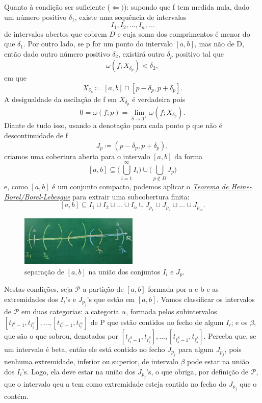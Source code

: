 \documentclass[../analysisII_notes.tex]{subfiles}
\begin{document}
\begin{proof*}
	Quanto à condição ser suficiente (\(\Leftarrow )\)): supondo que f tem medida nula, dado um número positivo \(\delta_{1}\), existe uma sequência de intervalos
	\[
		I_1, I_2, \dotsc , I_n, \dotsc
	\]
	de intervalos abertos que cobrem \(D\) e cuja soma dos comprimentos é menor do que \(\delta_1\). Por outro lado, se p for um ponto do intervalo \([a, b]\), mas não de D, então dado outro número positivo \(\delta_2\), existirá outro \(\delta_p\) positivo tal que
	\[
		\omega (f; X_{\delta_{p}}) < \delta_{2},
	\]
	em que
	\[
		X_{\delta_{p}} \coloneqq [a, b]\cap [p-\delta_p, p+\delta_p].
	\]
	A desigualdade da oscilação de f em \(X_{\delta_p}\) é verdadeira pois
	\[
		0 = \omega (f; p) = \lim_{\delta \to 0^{+}}\omega (f; X_{\delta_{p}}).
	\]
	Diante de tudo isso, usando a denotação para cada ponto p que não é descontinuidade de f
	\[
		J_{p}\coloneqq (p-\delta_p, p+\delta_p),
	\]
	criamos uma cobertura aberta para o intervalo \([a, b]\) da forma
	\[
		[a, b]\subseteq \biggl(\bigcup_{i=1}^{\infty}I_{i}\biggr)\cup \biggl(\bigcup_{p\not\in D}^{}J_{p}\biggr)
	\]
	e, como \([a, b]\) é um conjunto compacto, podemos aplicar o \hyperlink{heine_borel}{\textit{Teorema de Heine-Borel/Borel-Lebesgue}} para extrair uma subcobertura finita:
	\[
		[a, b] \subseteq I_1\cup I_2\cup \dotsc \cup I_{n}\cup J_{p_1}\cup J_{p_2}\cup \dotsc \cup J_{p_{m}}.
	\]
	\begin{figure}[H]
		\begin{center}
			\includegraphics[height=0.5\textheight, width=0.5\textwidth, keepaspectratio]{./Images/covering_intervals_13.png}
		\end{center}
		\caption{separação de \([a, b]\) na união dos conjuntos \(I_{i}\) e \(J_{p}\).}
		\label{aa13}
	\end{figure}

	Nestas condições, seja \(\mathcal{P}\) a partição de \([a, b]\) formada por a e b e as extremidades dos \(I_{i}\)'s e \(J_{p_{j}}\)'s que estão em \([a, b]\). Vamos classificar os intervalos de \(\mathcal{P}\) em duas categorias: a categoria \(\alpha \), formada pelos subintervalos \([t_{i_{1}^{\alpha }-1}, t_{i_{1}^{\alpha }}], \dotsc , [t_{i_{r}^{\alpha }-1}, t_{i_{r}^{\alpha }}]\) de P que estão contidos no fecho de algum \(I_{i}\); e os \(\beta \), que são o que sobrou, denotados por \([t_{i_{1}^{\beta }-1}, t_{i_{1}^{\beta }}],\dotsc ,[t_{i_{s}^{\beta }-1}, t_{i_{s}^{\beta }}]\).
	Perceba que, se um intervalo é beta, então ele está contido no fecho \(J_{p_{j}}\) para algum \(J_{p_{j}}\), pois nenhuma extremidade, inferior ou superior, de intervalo \(\beta \) pode estar na união dos \(I_{i}\)'s. Logo, ela deve estar na união dos \(J_{p_{j}}\)'s, o que obriga, por definição de \(\mathcal{P}\), que o intervalo qeu a tem como extremidade esteja contido no fecho do \(J_{p_{j}}\) que o contém.


\end{proof*}
\end{document}
